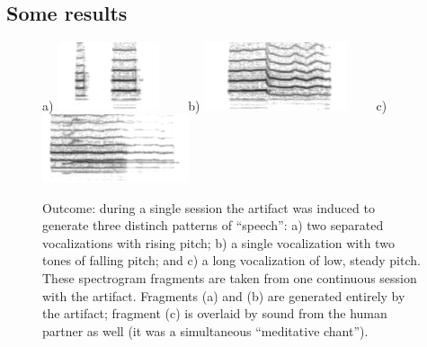 \subsection{Some results}


\begin{figure}[hbt]

\centerline{
a)
\includegraphics[height=2cm]{images/chico-output-separate-high-low}
\ \ 
\ \ 
b)
\includegraphics[height=2cm]{images/chico-output-pair-high-low}
\ \ 
\ \ 
c)
\includegraphics[height=2cm]{images/chico-output-ohm}
}

\caption{
%
\label{fig:outcome}
%
Outcome: during a single session the artifact was induced
to generate three distinch patterns of ``speech'': a) two separated
vocalizations with rising pitch; b) a single vocalization with
two tones of falling pitch; and c) a long vocalization of low, steady
pitch.
%
These spectrogram fragments are taken from one continuous session
with the artifact.  Fragments (a) and (b) are generated entirely
by the artifact; fragment (c) is overlaid by sound from
the human partner as well (it was a simultaneous ``meditative chant'').
%
}

\end{figure}





